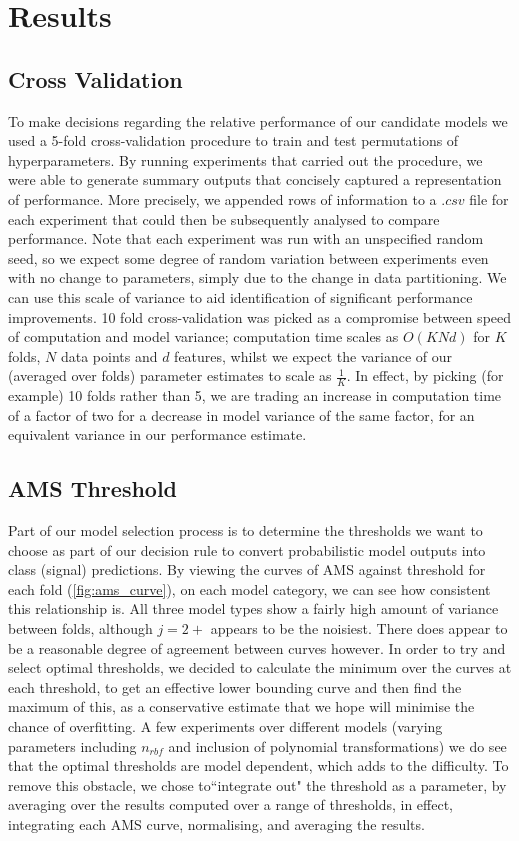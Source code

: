\section{Results}
\label{results}

\subsection{Cross Validation}
To make decisions regarding the relative performance of our candidate models we used a 5-fold cross-validation procedure to train and test permutations of hyperparameters. By running experiments that carried out the procedure, we were able to generate summary outputs that concisely captured a representation of performance. More precisely, we appended rows of information to a $.csv$ file for each experiment that could then be subsequently analysed to compare performance. Note that each experiment was run with an unspecified random seed, so we expect some degree of random variation between experiments even with no change to parameters, simply due to the change in data partitioning. We can use this scale of variance to aid identification of significant performance improvements. 10 fold cross-validation was picked as a compromise between speed of computation and model variance; computation time scales as $O(KNd)$ for $K$ folds, $N$ data points and $d$ features, whilst we expect the variance of our (averaged over folds) parameter estimates to scale as $\frac{1}{K}$. In effect, by picking (for example) 10 folds rather than 5, we are trading an increase in computation time of a factor of two for a decrease in model variance of the same factor, for an equivalent variance in our performance estimate.

\subsection{AMS Threshold}
Part of our model selection process is to determine the thresholds we want to choose as part of our decision rule to convert probabilistic model outputs into class (signal) predictions. By viewing the curves of AMS against threshold for each fold (\ref{fig:ams_curve}), on each model category, we can see how consistent this relationship is. All three model types show a fairly high amount of variance between folds, although $j=2+$ appears to be the noisiest. There does appear to be a reasonable degree of agreement between curves however. In order to try and select optimal thresholds, we decided to calculate the minimum over the curves at each threshold, to get an effective lower bounding curve and then find the maximum of this, as a conservative estimate that we hope will minimise the chance of overfitting. 
A few experiments over different models (varying parameters including $n_{rbf}$ and inclusion of polynomial transformations) we do see that the optimal thresholds are model dependent, which adds to the difficulty. To remove this obstacle, we chose to``integrate out" the threshold as a parameter, by averaging over the results computed over a range of thresholds, in effect, integrating each AMS curve, normalising, and averaging the results.


